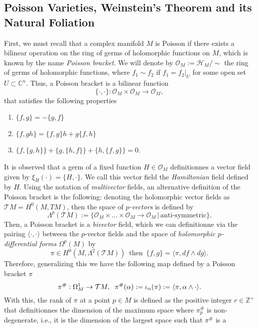 \documentclass[12pt,twoside,a4paper]{report}
\newcommand{\zah}{\ensuremath{ \mathbb Z }}
\newcommand{\con}{\ensuremath{\mathbb{C}^n}}
\newcommand{\om}{\ensuremath{\Omega}}
\newcommand{\osheaf}{\ensuremath{\mathcal O }}
\begin{document}
\subsection{Poisson Varieties, Weinstein's Theorem and its Natural Foliation}
\noindent First, we must recall that a complex manifold $M$ is Poisson if there exists a bilinear operation on the ring of germs of
holomorphic functions on $M$, which is known by the name \emph{Poisson bracket}.
We will denote by $\osheaf_M:=\mathcal{H}_M/\sim$ the ring of germs of holomorphic functions, where $f_1\sim f_2$ if
$f_1=f_2|_U$ for some open set $U\subset\con$. Thus, a Poisson bracket is a bilinear function
\[
\{\cdot,\cdot\}:\osheaf_M\times\mathcal{O}_M\rightarrow\mathcal{O}_M,
\]
that satisfies the following properties
\begin{enumerate}
\item $\{f,g\} = -\{g,f\}$
\item $\{f,gh\}=\{f,g\}h + g\{f,h\}$
\item $\{f,\{g,h\}\}+\{g,\{h,f\}\} + \{h,\{ f,g\}\}=0$.
\end{enumerate}
\noindent It is observed that a germ of a fixed function $H\in\osheaf_M$ definitionnes a vector field given by $\xi_H(\cdot)=\{H,\cdot\}$.
We call this vector field the \emph{Hamiltonian} field defined by $H$. Using the notation of \emph{multivector} fields,
an alternative definition of the Poisson bracket is the following: denoting the holomorphic vector fields as $\mathcal{T}M=H^0(M,TM)$,
then the space of \emph{$p$-vectors} is defined by
\[
        \Lambda^{p}(\mathcal{T}M):=\{\osheaf_M\times\dots\times\mathcal{O}_M\rightarrow\mathcal{O}_M\,\vert\,\text{anti-symmetric}\}.
\]
Then, a Poisson bracket is a \emph{bivector} field, which we can definitionne via the pairing $\langle\cdot,\cdot\rangle$
between the $p$-vector fields and the space of \emph{holomorphic $p$-differential forms} $\om^{p}(M)$ by
\[
        \pi\in H^0(M,\Lambda^2(\mathcal{T}M))\,\text{ then }\,\{f,g\}=\langle \pi,df\wedge dg\rangle.
\]
Therefore, generalizing this we have the following map defined by a Poisson bracket $\pi$
\[
        \pi^{\#}:\om^1_M\rightarrow\mathcal{T}M,\hspace{0.2cm}\pi^{\#}(\alpha):=\iota_{\alpha}(\pi):=\langle\pi,\alpha\wedge\cdot\rangle.
\]
\noindent With this, the rank of $\pi$ at a point $p\in M$ is defined as the positive integer $r\in \zah^{+}$ that definitionnes the dimension of the
maximum space where $\pi^{\#}_p$ is non-degenerate, i.e., it is the dimension of the largest space such that $\pi^{\#}$ is a
\end{document}
